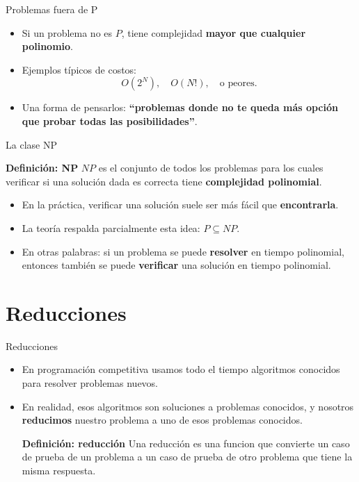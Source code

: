 \documentclass[aspectratio=169]{beamer}
\begin{document}
\begin{frame}{Problemas fuera de P}
  \begin{itemize}
    \item Si un problema no es $P$, tiene complejidad \textbf{mayor que cualquier polinomio}.
    \item Ejemplos típicos de costos:
      \[
        O(2^N),\quad O(N!),\quad \text{o peores.}
      \]
    \item Una forma de pensarlos: \textbf{“problemas donde no te queda más opción que probar todas las posibilidades”}.
  \end{itemize}
\end{frame}

\begin{frame}{La clase NP}
  \begin{block}{\textbf{Definición: NP}}
    $NP$ es el conjunto de todos los problemas para los cuales verificar si una solución dada es correcta tiene \textbf{complejidad polinomial}.
  \end{block}
  \begin{itemize}
    \item En la práctica, verificar una solución suele ser más fácil que \textbf{encontrarla}.
    \item La teoría respalda parcialmente esta idea: $P \subseteq NP$.
    \item En otras palabras: si un problema se puede \textbf{resolver} en tiempo polinomial,
      entonces también se puede \textbf{verificar} una solución en tiempo polinomial.
  \end{itemize}
\end{frame}

\section{Reducciones}


\begin{frame}{Reducciones}
    \begin{itemize}
        \item En programación competitiva usamos todo el tiempo algoritmos conocidos para resolver problemas nuevos.
        \item En realidad, esos algoritmos son soluciones a problemas conocidos, y nosotros \textbf{reducimos} nuestro problema a uno de esos problemas conocidos.
        \begin{block}{\textbf{Definición: reducción}}
          Una reducción es una funcion que convierte un caso de prueba de un problema a un caso de prueba de otro problema que tiene la misma respuesta.
        \end{block}
    \end{itemize}
\end{frame}
\end{document}
